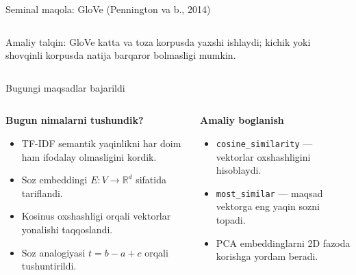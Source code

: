 \documentclass[aspectratio=169,11pt]{beamer}
\begin{document}
\begin{frame}{Seminal maqola: GloVe (Pennington va b., 2014)}
\begin{columns}[T,totalwidth=\textwidth]
\begin{column}{0.46\textwidth}
\vspace{2pt}

\begin{tcolorbox}[alertbox,left=2mm,right=2mm,top=1mm,bottom=1mm]
\scriptsize
Amaliy talqin: GloVe katta va toza korpusda yaxshi ishlaydi;
kichik yoki shovqinli korpusda natija barqaror bo\textquotesingle{}lmasligi mumkin.
\end{tcolorbox}

\end{column}
\end{columns}

\end{frame}

\begin{frame}{Bugungi maqsadlar bajarildi}
\footnotesize

\begin{columns}[T,totalwidth=\textwidth]
\begin{column}{0.50\textwidth}

\textbf{Bugun nimalarni tushundik?}

\begin{itemize}\setlength\itemsep{5pt}
  \item TF-IDF semantik yaqinlikni har doim ham ifodalay olmasligini ko\textquotesingle{}rdik.
  \item So\textquotesingle{}z embeddingi $E:V\rightarrow \mathbb{R}^{d}$ sifatida ta\textquotesingle{}riflandi.
  \item Kosinus o\textquotesingle{}xshashligi orqali vektorlar yo\textquotesingle{}nalishi taqqoslandi.
  \item So\textquotesingle{}z analogiyasi $t=b-a+c$ orqali tushuntirildi.
\end{itemize}

\end{column}

\begin{column}{0.46\textwidth}

\textbf{Amaliy bog\textquotesingle{}lanish}

\begin{itemize}\setlength\itemsep{5pt}
  \item \texttt{cosine\_similarity} — vektorlar o\textquotesingle{}xshashligini hisoblaydi.
  \item \texttt{most\_similar} — maqsad vektorga eng yaqin so\textquotesingle{}zni topadi.
  \item PCA embeddinglarni 2D fazoda ko\textquotesingle{}rishga yordam beradi.
\end{itemize}


\end{column}
\end{columns}
\end{frame}
\end{document}

